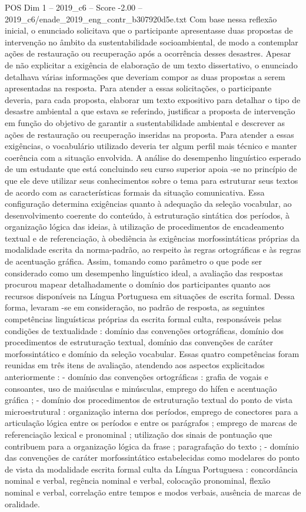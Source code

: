 \begin{textsample}{POS Dim 1 – 2019\_c6 – Score -2.00 – 2019\_c6/enade\_2019\_eng\_contr\_b307920d5e.txt}
Com base nessa reflexão inicial, o enunciado solicitava que o participante apresentasse duas propostas de intervenção no âmbito da sustentabilidade socioambiental, de modo a contemplar ações de restauração ou recuperação após a ocorrência desses desastres.
Apesar de não explicitar a exigência de elaboração de um texto dissertativo, o enunciado detalhava várias informações que deveriam compor as duas propostas a serem apresentadas na resposta.
Para atender a essas solicitações, o participante deveria, para cada proposta, elaborar um texto expositivo para detalhar o tipo de desastre ambiental a que estava se referindo, justificar a proposta de intervenção em função do objetivo de garantir a sustentabilidade ambiental e descrever as ações de restauração ou recuperação inseridas na proposta.
Para atender a essas exigências, o vocabulário utilizado deveria ter algum perfil mais técnico e manter coerência com a situação envolvida.
A análise do desempenho linguístico esperado de um estudante que está concluindo seu curso superior apoia -se no princípio de que ele deve utilizar seus conhecimentos sobre o tema para estruturar seus textos de acordo com as características formais da situação comunicativa.
Essa configuração determina exigências quanto à adequação da seleção vocabular, ao desenvolvimento coerente do conteúdo, à estruturação sintática dos períodos, à organização lógica das ideias, à utilização de procedimentos de encadeamento textual e de referenciação, à obediência às exigências morfossintáticas próprias da modalidade escrita da norma-padrão, ao respeito às regras ortográficas e às regras de acentuação gráfica.
Assim, tomando como parâmetro o que pode ser considerado como um desempenho linguístico ideal, a avaliação das respostas procurou mapear detalhadamente o domínio dos participantes quanto aos recursos disponíveis na Língua Portuguesa em situações de escrita formal.
Dessa forma, levaram -se em consideração, no padrão de resposta, as seguintes competências linguísticas próprias da escrita formal culta, responsáveis pelas condições de textualidade : domínio das convenções ortográficas, domínio dos procedimentos de estruturação textual, domínio das convenções de caráter morfossintático e domínio da seleção vocabular.
Essas quatro competências foram reunidas em três itens de avaliação, atendendo aos aspectos explicitados anteriormente : - domínio das convenções ortográficas : grafia de vogais e consoantes, uso de maiúsculas e minúsculas, emprego do hífen e acentuação gráfica ; - domínio dos procedimentos de estruturação textual do ponto de vista microestrutural : organização interna dos períodos, emprego de conectores para a articulação lógica entre os períodos e entre os parágrafos ; emprego de marcas de referenciação lexical e pronominal ; utilização dos sinais de pontuação que contribuem para a organização lógica da frase ; paragrafação do texto ; - domínio das convenções de caráter morfossintático estabelecidas como modelares do ponto de vista da modalidade escrita formal culta da Língua Portuguesa : concordância nominal e verbal, regência nominal e verbal, colocação pronominal, flexão nominal e verbal, correlação entre tempos e modos verbais, ausência de marcas de oralidade.

\end{textsample}

